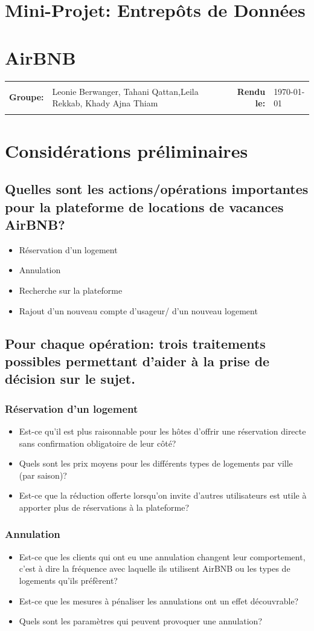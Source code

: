 \documentclass[11pt]{article}
\newcommand{\metaInfo}[4]{
	\begin{tabularx}{\textwidth}{rXrl}
	\hline \\
	\textbf{Groupe:}	& #1 &  \textbf{Rendu le:}   & #2 \\
	\\ \hline
	\end{tabularx}
}
\newcommand{\heading}[2]{
	\begin{center}
	\section*{#1}
	\section*{#2}
	\end{center}
}
\begin{document}
\heading{Mini-Projet: Entrepôts de Données}{AirBNB}
\metaInfo{Leonie Berwanger, Tahani Qattan,\newline Leila Rekkab, Khady Ajna Thiam}{\today}

\section{}
\section{Considérations préliminaires}
\subsection{Quelles sont les actions/opérations importantes pour la plateforme de locations de vacances AirBNB?}
\begin{itemize}
	\item Réservation d'un logement
	\item Annulation
	\item Recherche sur la plateforme
	\item Rajout d'un nouveau compte d'usageur/ d'un nouveau logement
\end{itemize}
\subsection{Pour chaque opération: trois traitements possibles permettant d’aider à la prise de décision sur le sujet.}
\subsubsection*{Réservation d'un logement}
\begin{itemize}
	\item Est-ce qu'il est plus raisonnable pour les hôtes d'offrir une réservation directe sans confirmation obligatoire de leur côté?
	\item Quels sont les prix moyens pour les différents types de logements par ville (par saison)?
	\item Est-ce que la réduction offerte lorsqu'on invite d'autres utilisateurs est utile à apporter plus de réservations à la plateforme?
\end{itemize}
\subsubsection*{Annulation}
\begin{itemize}
	\item Est-ce que les clients qui ont eu une annulation changent leur comportement, c'est à dire la fréquence avec laquelle ils utilisent AirBNB ou les types de logements qu'ils préfèrent?
	\item Est-ce que les mesures à pénaliser les annulations ont un effet découvrable?
	\item  Quels sont les paramètres qui peuvent provoquer une annulation?
\end{itemize}
\end{document}

